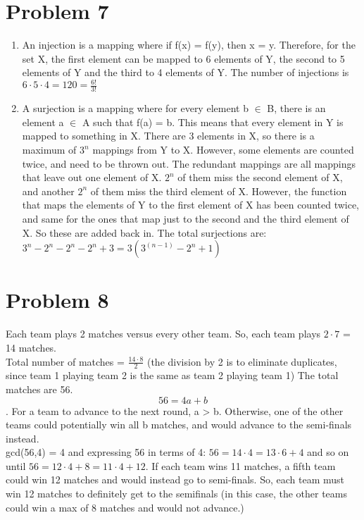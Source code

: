 \documentclass[english]{article}
\begin{document}
\section*{Problem 7}
\begin{enumerate} [label=\alph*]
\item An injection is a mapping where if f(x) = f(y), then x = y. Therefore, for the set X, the first element can be mapped to 6 elements of Y, the second to 5 elements of Y and the third to 4 elements of Y. The number of injections is $6 \cdot 5 \cdot 4 = 120 = \frac{6!}{3!}$
\item A surjection is a mapping where for every element b $\in$ B, there is an element a $\in$ A such that f(a) = b. This means that every element in Y is mapped to something in X. There are 3 elements in X, so there is a maximum of $3^n$ mappings from Y to X. However, some elements are counted twice, and need to be thrown out. The redundant mappings are all mappings that leave out one element of  X. $2^n$ of them miss the second element of X, and another $2^n$ of them miss the third element of X. However, the function that maps the elements of Y to the first element of X has been counted twice, and same for the ones that map just to the second and the third element of X. So these are added back in. The total surjections are: $3^n - 2^n - 2^n - 2^n + 3 = 3(3^{(n-1)} - 2^{n} + 1)$
\end{enumerate}
\section*{Problem 8}
Each team plays 2 matches versus every other team. So, each team plays $2 \cdot 7$ = 14 matches. 
\\ Total number of matches  = $\frac{14 \cdot 8}{2}$ (the division by 2 is to eliminate duplicates, since team 1 playing team 2 is the same as team 2 playing team 1) The total matches are 56.\\
$$ 56 = 4a + b$$.
For a team to advance to the next round, a > b. Otherwise, one of the other teams could potentially win all b matches, and would advance to the semi-finals instead.
\\ gcd(56,4) = 4 and expressing 56 in terms of 4: $56 = 14 \cdot 4 = 13 \cdot 6 + 4 $ and so on until $ 56 = 12 \cdot 4 + 8 = 11 \cdot 4 + 12$. If each team wins 11 matches, a fifth team could win 12 matches and would instead go to semi-finals. So, each team must win 12 matches to definitely get to the semifinals (in this case, the other teams could win a max of 8 matches and would not advance.)
\end{document}

